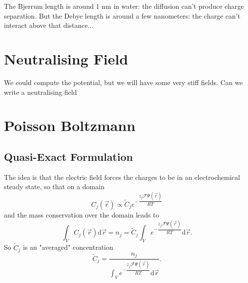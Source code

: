 \documentclass{revtex4}
\begin{document}
The Bjerrum length is around 1 nm in water: the diffusion can't produce charge separation.
But the Debye length is around a few nanometers: the charge can't interact above that distance...

\section{Neutralising Field}
We could compute the potential, but we will have some very stiff fields.
Can we write a neutralising field 

\section{Poisson Boltzmann}
\subsection{Quasi-Exact Formulation}
The idea is that the electric field forces the charges to be in an electrochemical steady
state, so that on a domain
\begin{equation}
	C_j(\vec{r}) \propto \tilde{C}_j e^{-\dfrac{z_j\mathcal{F}\Psi(\vec{r})}{RT}}
\end{equation}
and the mass conservation over the domain leads to
\begin{equation}
	\int_V  C_j(\vec{r}) \mathrm{d}\vec{r} = n_j = \tilde{C}_j \int_V e^{-\dfrac{z_j\mathcal{F}\Psi(\vec{r})}{RT}} \mathrm{d}\vec{r}.
\end{equation}
So $\tilde{C}_j$ is an "averaged" concentration
$$
	\tilde{C}_j = \dfrac{n_j}{\int_V e^{-\dfrac{z_j\mathcal{F}\Psi(\vec{r})}{RT}} \mathrm{d}\vec{r}}.
$$
\end{document}
